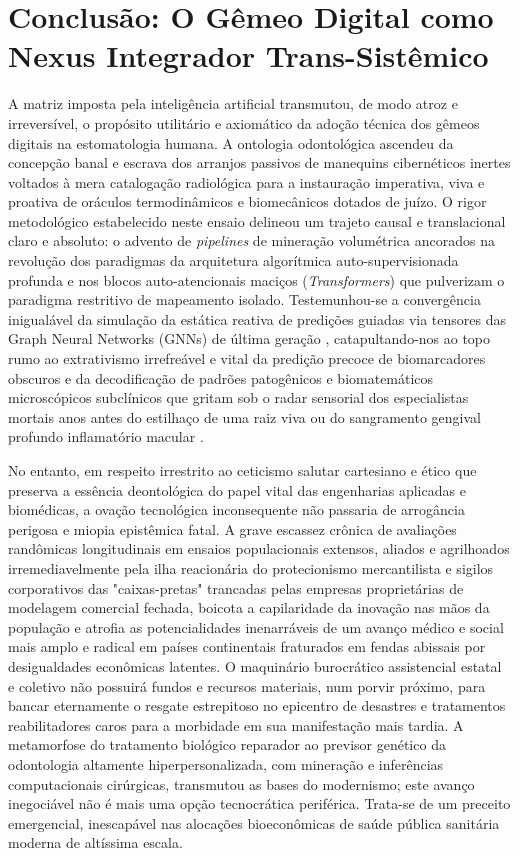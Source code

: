 \section{Conclusão: O Gêmeo Digital como Nexus Integrador Trans-Sistêmico}
\label{sec:ia-conclusao}

A matriz imposta pela inteligência artificial transmutou, de modo atroz e irreversível, o propósito utilitário e axiomático da adoção técnica dos gêmeos digitais na estomatologia humana. A ontologia odontológica ascendeu da concepção banal e escrava dos arranjos passivos de manequins cibernéticos inertes voltados à mera catalogação radiológica para a instauração imperativa, viva e proativa de oráculos termodinâmicos e biomecânicos dotados de juízo. O rigor metodológico estabelecido neste ensaio delineou um trajeto causal e translacional claro e absoluto: o advento de \textit{pipelines} de mineração volumétrica ancorados na revolução dos paradigmas da arquitetura algorítmica auto-supervisionada profunda e nos blocos auto-atencionais maciços (\textit{Transformers}) que pulverizam o paradigma restritivo de mapeamento isolado. Testemunhou-se a convergência inigualável da simulação da estática reativa de predições guiadas via tensores das Graph Neural Networks (GNNs) de última geração \cite{zhang2024recursive}, catapultando-nos ao topo rumo ao extrativismo irrefreável e vital da predição precoce de biomarcadores obscuros e da decodificação de padrões patogênicos e biomatemáticos microscópicos subclínicos que gritam sob o radar sensorial dos especialistas mortais anos antes do estilhaço de uma raiz viva ou do sangramento gengival profundo inflamatório macular \cite{elsaid2026digital, nature2026digital}.

No entanto, em respeito irrestrito ao ceticismo salutar cartesiano e ético que preserva a essência deontológica do papel vital das engenharias aplicadas e biomédicas, a ovação tecnológica inconsequente não passaria de arrogância perigosa e miopia epistêmica fatal. A grave escassez crônica de avaliações randômicas longitudinais em ensaios populacionais extensos, aliados e agrilhoados irremediavelmente pela ilha reacionária do protecionismo mercantilista e sigilos corporativos das "caixas-pretas" trancadas pelas empresas proprietárias de modelagem comercial fechada, boicota a capilaridade da inovação nas mãos da população e atrofia as potencialidades inenarráveis de um avanço médico e social mais amplo e radical em países continentais fraturados em fendas abissais por desigualdades econômicas latentes. O maquinário burocrático assistencial estatal e coletivo não possuirá fundos e recursos materiais, num porvir próximo, para bancar eternamente o resgate estrepitoso no epicentro de desastres e tratamentos reabilitadores caros para a morbidade em sua manifestação mais tardia. A metamorfose do tratamento biológico reparador ao previsor genético da odontologia altamente hiperpersonalizada, com mineração e inferências computacionais cirúrgicas, transmutou as bases do modernismo; este avanço inegociável não é mais uma opção tecnocrática periférica. Trata-se de um preceito emergencial, inescapável nas alocações bioeconômicas de saúde pública sanitária moderna de altíssima escala.

